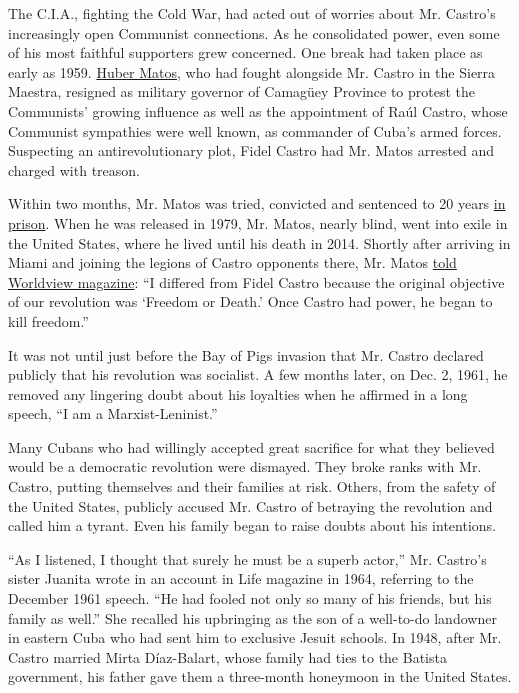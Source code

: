 The C.I.A., fighting the Cold War, had acted out of worries about Mr.
Castro's increasingly open Communist connections. As he consolidated
power, even some of his most faithful supporters grew concerned. One
break had taken place as early as 1959.
\href{http://www.nytimes3xbfgragh.onion/2014/03/01/world/americas/huber-matos-comrade-of-castro-then-adversary-dies-at-95.html}{Huber
Matos}, who had fought alongside Mr. Castro in the Sierra Maestra,
resigned as military governor of Camagüey Province to protest the
Communists' growing influence as well as the appointment of Raúl Castro,
whose Communist sympathies were well known, as commander of Cuba's armed
forces. Suspecting an antirevolutionary plot, Fidel Castro had Mr. Matos
arrested and charged with treason.

Within two months, Mr. Matos was tried, convicted and sentenced to 20
years
\href{http://query.nytimes3xbfgragh.onion/gst/abstract.html?res=9500EFDE1F39E63BBC4F52DFB767838E669EDE}{in
prison}. When he was released in 1979, Mr. Matos, nearly blind, went
into exile in the United States, where he lived until his death in 2014.
Shortly after arriving in Miami and joining the legions of Castro
opponents there, Mr. Matos
\href{http://worldview.carnegiecouncil.org/archive/worldview/1980/04/3361.html/_res/id=sa_File1/v23_i004_a002.pdf}{told
Worldview magazine}: ``I differed from Fidel Castro because the original
objective of our revolution was `Freedom or Death.' Once Castro had
power, he began to kill freedom.''

It was not until just before the Bay of Pigs invasion that Mr. Castro
declared publicly that his revolution was socialist. A few months later,
on Dec. 2, 1961, he removed any lingering doubt about his loyalties when
he affirmed in a long speech, ``I am a Marxist-Leninist.''

Many Cubans who had willingly accepted great sacrifice for what they
believed would be a democratic revolution were dismayed. They broke
ranks with Mr. Castro, putting themselves and their families at risk.
Others, from the safety of the United States, publicly accused Mr.
Castro of betraying the revolution and called him a tyrant. Even his
family began to raise doubts about his intentions.

``As I listened, I thought that surely he must be a superb actor,'' Mr.
Castro's sister Juanita wrote in an account in Life magazine in 1964,
referring to the December 1961 speech. ``He had fooled not only so many
of his friends, but his family as well.'' She recalled his upbringing as
the son of a well-to-do landowner in eastern Cuba who had sent him to
exclusive Jesuit schools. In 1948, after Mr. Castro married Mirta
Díaz-Balart, whose family had ties to the Batista government, his father
gave them a three-month honeymoon in the United States.

